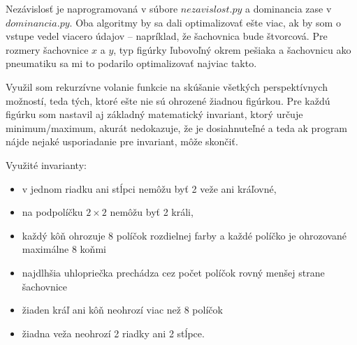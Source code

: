 
Nezávislosť je naprogramovaná v súbore $nezavislost.py$ a dominancia zase 
v $dominancia.py$. Oba algoritmy by sa dali optimalizovať ešte viac, 
ak by som o vstupe vedel viacero údajov -- napríklad, že šachovnica bude 
štvorcová. Pre rozmery šachovnice $x$ a $y$, typ figúrky ľubovoľný okrem 
pešiaka a šachovnicu ako pneumatiku sa mi to podarilo optimalizovať 
najviac takto.

Využil som rekurzívne volanie funkcie na skúšanie všetkých 
perspektívnych možností, teda tých, ktoré ešte nie sú ohrozené žiadnou 
figúrkou. Pre každú figúrku som nastavil aj základný matematický 
invariant, ktorý určuje minimum/maximum, akurát nedokazuje, že je 
dosiahnuteľné a teda ak program nájde nejaké usporiadanie pre invariant, 
môže skončiť.

Využité invarianty:
\begin{itemize}
    \item v jednom riadku ani stĺpci nemôžu byť 2 veže ani kráľovné,
    \item na podpolíčku $2\times 2$ nemôžu byť 2 králi,
    \item každý kôň ohrozuje 8 políčok rozdielnej farby a každé políčko
    je ohrozované maximálne 8 koňmi
    \item najdlhšia uhlopriečka prechádza cez počet políčok rovný menšej
    strane šachovnice
    \item žiaden kráľ ani kôň neohrozí viac než 8 políčok
    \item žiadna veža neohrozí 2 riadky ani 2 stĺpce.
\end{itemize}

